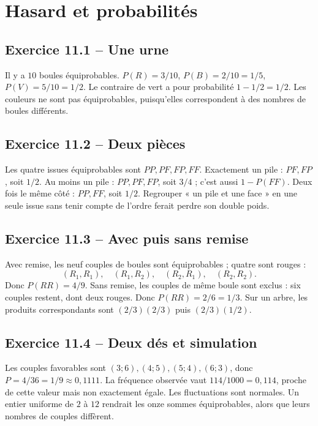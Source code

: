 \chapter{Hasard et probabilités}
\label{corriges:11}
\section*{Exercice 11.1 -- Une urne}
Il y a $10$ boules équiprobables. $P(R)=3/10$, $P(B)=2/10=1/5$, $P(V)=5/10=1/2$. Le contraire de vert a pour probabilité $1-1/2=1/2$. Les couleurs ne sont pas équiprobables, puisqu'elles correspondent à des nombres de boules différents.

\section*{Exercice 11.2 -- Deux pièces}
Les quatre issues équiprobables sont $PP,PF,FP,FF$. Exactement un pile : $PF,FP$, soit $1/2$. Au moins un pile : $PP,PF,FP$, soit $3/4$ ; c'est aussi $1-P(FF)$. Deux fois le même côté : $PP,FF$, soit $1/2$. Regrouper « un pile et une face » en une seule issue sans tenir compte de l'ordre ferait perdre son double poids.

\section*{Exercice 11.3 -- Avec puis sans remise}
Avec remise, les neuf couples de boules sont équiprobables ; quatre sont rouges :
\[(R_1,R_1),\quad(R_1,R_2),\quad(R_2,R_1),\quad(R_2,R_2).\]
Donc $P(RR)=4/9$.
Sans remise, les couples de même boule sont exclus : six couples restent, dont deux rouges. Donc $P(RR)=2/6=1/3$. Sur un arbre, les produits correspondants sont $(2/3)(2/3)$ puis $(2/3)(1/2)$.

\section*{Exercice 11.4 -- Deux dés et simulation}
Les couples favorables sont $(3;6),(4;5),(5;4),(6;3)$, donc $P=4/36=1/9\approx0{,}1111$. La fréquence observée vaut $114/1000=0{,}114$, proche de cette valeur mais non exactement égale. Les fluctuations sont normales. Un entier uniforme de $2$ à $12$ rendrait les onze sommes équiprobables, alors que leurs nombres de couples diffèrent.
